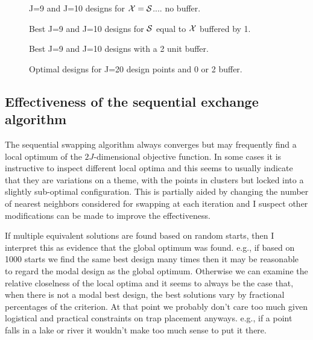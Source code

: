 \documentclass[useAMS,referee]{biom}
\begin{document}
\begin{figure}
\centering
\caption{J=9 and J=10 designs for 
 ${\cal X} = {\cal S}$.... no buffer.
}
\label{fig.fig1}
\end{figure}


\begin{figure}
\centering
\caption{
Best J=9 and J=10 designs for 
${\cal S}$ equal to 
${\cal X}$ buffered by 1.
}
\label{fig.fig2}
\end{figure}

\begin{figure}
\centering
\caption{
Best J=9 and J=10 designs with a 2 unit buffer.
}
\label{fig.fig3}
\end{figure}



\begin{figure}
\centering
\caption{
Optimal designs for J=20 design points and 0 or 2 buffer.
}
\label{fig.fig4}
\end{figure}

\subsection{Effectiveness of the sequential exchange algorithm}

The sequential swapping algorithm always converges but may frequently
find a local optimum of the $2J$-dimensional objective function. In
some cases it is instructive to inspect different local optima and
this seems to usually indicate that they are variations on a theme,
with the points in clusters but locked into a slightly sub-optimal
configuration. This is partially
aided by changing the number of nearest neighbors considered for
swapping at each iteration and I suspect other modifications can be
made to improve the effectiveness.

If multiple equivalent solutions are found based on random starts,
then I interpret this as evidence that the global optimum was
found. e.g., if based on 1000 starts we find the same best design many
times then it may be reasonable to regard the modal design as the
global optimum.  Otherwise we can examine the relative closelness
of the local optima and it seems to always be the case that, when
there is not a modal best design, 
the best solutions vary by fractional percentages of the
criterion. At that point we probably don't care too much given
logistical and practical constraints on trap placement anyways. e.g.,
if a point falls in a lake or river it wouldn't make too much sense to
put it there.
\end{document}
